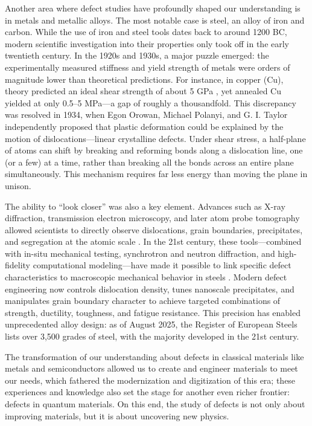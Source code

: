 \vspace{1cm}

Another area where defect studies have profoundly shaped our understanding is in metals and metallic alloys. The most notable case is steel, an alloy of iron and carbon. While the use of iron and steel tools dates back to around 1200 BC, modern scientific investigation into their properties only took off in the early twentieth century. In the 1920s and 1930s, a major puzzle emerged: the experimentally measured stiffness and yield strength of metals were orders of magnitude lower than theoretical predictions. For instance, in copper (Cu), theory predicted an ideal shear strength of about 5 GPa \cite{frenkelZurTheorieElastizitaetsgrenze1926}, yet annealed Cu yielded at only 0.5–5 MPa—a gap of roughly a thousandfold. This discrepancy was resolved in 1934, when Egon Orowan, Michael Polanyi, and G. I. Taylor independently proposed that plastic deformation could be explained by the motion of dislocations—linear crystalline defects. Under shear stress, a half-plane of atoms can shift by breaking and reforming bonds along a dislocation line, one (or a few) at a time, rather than breaking all the bonds across an entire plane simultaneously. This mechanism requires far less energy than moving the plane in unison.

The ability to “look closer” was also a key element. Advances such as X-ray diffraction, transmission electron microscopy, and later atom probe tomography allowed scientists to directly observe dislocations, grain boundaries, precipitates, and segregation at the atomic scale \cite{50YearsTEM}\cite{guoSegregationdislocationSelforganizedStructures2025}\cite{AtomProbeTomography}. In the 21st century, these tools—combined with in-situ mechanical testing, synchrotron and neutron diffraction, and high-fidelity computational modeling—have made it possible to link specific defect characteristics to macroscopic mechanical behavior in steels \cite{liReviewRecentProgress2022}\cite{kimSituNeutronDiffraction2020}\cite{gadalinskaDirectDeterminationPhase2021}. Modern defect engineering now controls dislocation density, tunes nanoscale precipitates, and manipulates grain boundary character to achieve targeted combinations of strength, ductility, toughness, and fatigue resistance. This precision has enabled unprecedented alloy design: as of August 2025, the Register of European Steels lists over 3,500 grades of steel, with the majority developed in the 21st century.

The transformation of our understanding about defects in classical materials like metals and semiconductors allowed us to create and engineer materials to meet our needs, which fathered the modernization and digitization of this era; these experiences and knowledge also set the stage for another even richer frontier: defects in quantum materials. On this end, the study of defects is not only about improving materials, but it is about uncovering new physics. 

